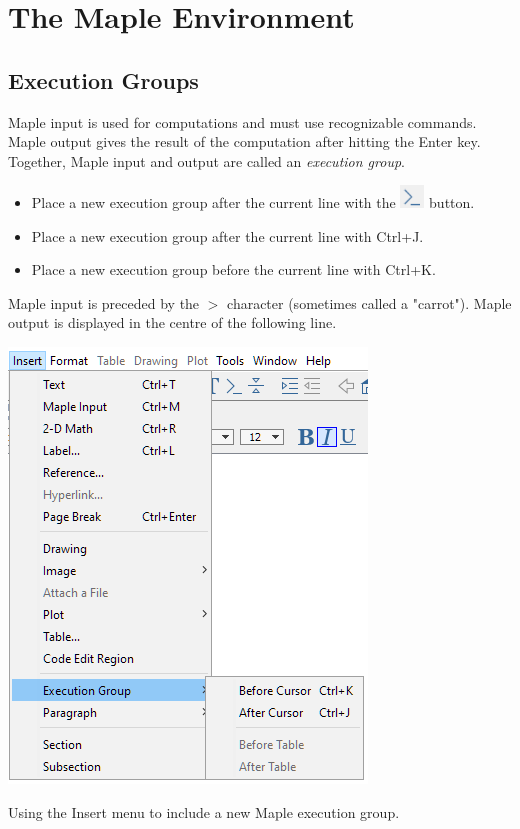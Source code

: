 \chapter{The Maple Environment}
\label{chp:maple_environment}			

\section{Execution Groups}
\label{sec:execution_groups}

Maple input is used for computations and must use recognizable commands. Maple output gives the result of the computation after hitting the Enter key. Together, Maple input and output are called an \textit{execution group}.
\begin{itemize}
\item Place a new execution group after the current line with the \includegraphics[width=0.05\textwidth]{tutorials/figures/new_input.PNG} button.
\item Place a new execution group after the current line with Ctrl+J.
\item Place a new execution group before the current line with Ctrl+K.
\end{itemize}
Maple input is preceded by the $>$ character (sometimes called a "carrot"). Maple output is displayed in the centre of the following line.

\begin{marginfigure}
\includegraphics[scale=0.5]{tutorials/figures/InsertInput.png}
\caption{Using the Insert menu to include a new Maple execution group.}
\end{marginfigure}

